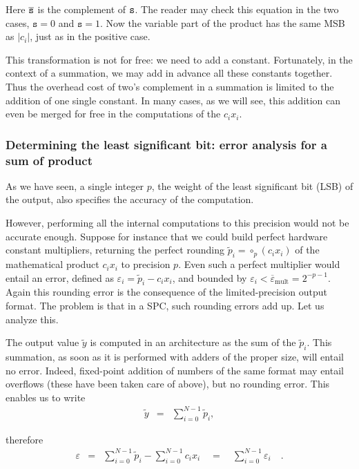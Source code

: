 \documentclass[twocolumn]{IEEEtran}
\newcommand{\abserr}{\varepsilon}
\newcommand{\maxerr}{\bound{\abserr}}
\newcommand{\bound}[1]{\overline{#1}}
\begin{document}
Here $\tt \overline{s}$ is the complement of $\tt s$. 
The reader may check this equation in the two cases, $\mathtt{s}=0$ and $\mathtt{s}=1$. 
Now the variable part of the product has the same MSB as $|c_i|$, just as in the positive case.

This transformation is not for free: we need to add a constant.
Fortunately, in the context of a summation, we may add in advance all these constants together.
Thus the overhead cost of two's complement in a summation is  limited to the addition of one single constant.
In many cases, as we will see, this addition can even be merged for free in the computations of the $c_ix_i$.


\subsubsection{Determining the least significant bit: error analysis for a sum of product \label{sec:erroranalysis}}
As we have seen, a single integer $p$,  the weight of the  least significant bit (LSB) of the output, also specifies  the accuracy of the computation. 

However, performing all the internal computations to this precision would not be accurate enough. 
Suppose for instance that we could build perfect hardware constant multipliers,  returning the perfect rounding $\widetilde{p}_i=\circ_p(c_ix_i)$ of the mathematical product $c_ix_i$ to precision $p$. 
Even such a perfect multiplier would entail an error, defined as $\abserr_i = \widetilde{p}_i - c_ix_i$, and bounded by $ \abserr_i < \maxerr_{\text{mult}}=2^{-p-1}$. 
Again this rounding error is the consequence of the limited-precision output format.
The problem is that in a SPC, such rounding errors add up.
Let us analyze this.

The output value $\widetilde{y}$ is computed in an architecture as the sum of the $\widetilde{p}_i$. 
This summation, as soon as it is performed with adders of the proper size, will entail no error.
Indeed, fixed-point addition of numbers of the same format may entail overflows (these have been taken care of above), but no rounding error.
This enables us to write 
\begin{eqnarray}
  \label{eq:errorlesssum}
  \widetilde{y}&=&\sum_{i=0}^{N-1} \widetilde{p}_i, 
 \end{eqnarray}

therefore 
\begin{eqnarray}
  \label{eq:globalerror}
  \abserr &= & \sum_{i=0}^{N-1} \widetilde{p}_i - \sum_{i=0}^{N-1} c_i x_i 
  \quad = \quad \sum_{i=0}^{N-1} \abserr_i \quad .
\end{eqnarray}
\end{document}
